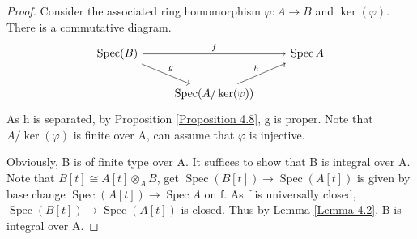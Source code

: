 \documentclass{ctexart}
\newcommand{\spec}{\operatorname{Spec}}
\begin{document}
\begin{proof}
    Consider the associated ring homomorphism $\varphi: A \longrightarrow B$ and $\ker(\varphi)$.
    There is a commutative diagram.
    \begin{equation*}
        \begin{tikzcd}
            \spec(B) \arrow[rr, "f"] \arrow[dr, "g"] &&
            \spec A \\
            & \spec(A/\ker(\varphi)) \arrow[ur, "h"] &
        \end{tikzcd}
    \end{equation*}
    As h is separated, by Proposition \ref{Proposition 4.8}, g is proper.
    Note that $A/\ker(\varphi)$ is finite over A, can assume that $\varphi$ is injective.
    \par
    Obviously, B is of finite type over A.
    It suffices to show that B is integral over A.
    Note that $B[t] \cong A[t] \otimes_{A} B$, get $\spec(B[t]) \longrightarrow \spec(A[t])$ is given by base change $\spec(A[t]) \longrightarrow \spec A$ on f.
    As f is universally closed, $\spec(B[t]) \longrightarrow \spec(A[t])$ is closed.
    Thus by Lemma \ref{Lemma 4.2}, B is integral over A.
\end{proof}
\end{document}
